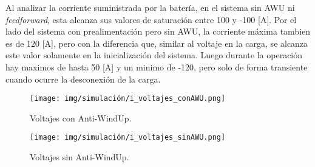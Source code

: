 Al analizar la corriente suministrada por la batería, en el sistema sin AWU ni \textit{feedforward}, esta alcanza sus
valores de saturación entre 100 y -100 [A]. Por el lado del sistema con prealimentación pero sin AWU, la corriente máxima
tambien es de 120 [A], pero con la diferencia que, similar al voltaje en la carga, se alcanza este valor solamente en
la inicialización del sistema. Luego durante la operación hay maximos de hasta 50 [A] y un minimo de -120, pero solo de forma 
transiente cuando ocurre la desconexión de la carga.


\begin{figure}[H]
    \centering
    \texttt{[image: img/simulación/i\_voltajes\_conAWU.png]}
    \caption{Voltajes con Anti-WindUp.}
    \label{fig:i_voltajes_conAWU}
\end{figure}

\begin{figure}[H]
    \centering
    \texttt{[image: img/simulación/i\_voltajes\_sinAWU.png]}
    \caption{Voltajes sin Anti-WindUp.}
    \label{fig:i_voltajes_sinAWU}
\end{figure}

\newpage